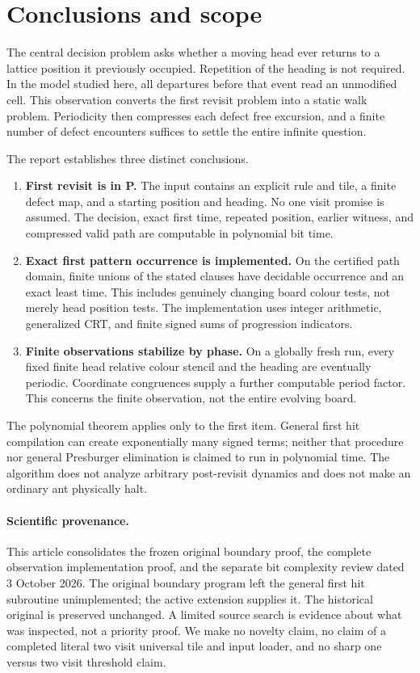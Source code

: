 \documentclass[11pt,letterpaper]{article}
\theoremstyle{definition}\newtheorem{definition}[theorem]{Definition}
\theoremstyle{remark}\newtheorem{remark}[theorem]{Remark}
\begin{document}
\section{Conclusions and scope}\label{ptr:sec:scope}
The central decision problem asks whether a moving head ever returns to a lattice position it previously occupied. Repetition of the heading is not required. In the model studied here, all departures before that event read an unmodified cell. This observation converts the first revisit problem into a static walk problem. Periodicity then compresses each defect free excursion, and a finite number of defect encounters suffices to settle the entire infinite question.

The report establishes three distinct conclusions.
\begin{enumerate}
\item \textbf{First revisit is in P.} The input contains an explicit rule and tile, a finite defect map, and a starting position and heading. No one visit promise is assumed. The decision, exact first time, repeated position, earlier witness, and compressed valid path are computable in polynomial bit time.
\item \textbf{Exact first pattern occurrence is implemented.} On the certified path domain, finite unions of the stated clauses have decidable occurrence and an exact least time. This includes genuinely changing board colour tests, not merely head position tests. The implementation uses integer arithmetic, generalized CRT, and finite signed sums of progression indicators.
\item \textbf{Finite observations stabilize by phase.} On a globally fresh run, every fixed finite head relative colour stencil and the heading are eventually periodic. Coordinate congruences supply a further computable period factor. This concerns the finite observation, not the entire evolving board.
\end{enumerate}

The polynomial theorem applies only to the first item. General first hit compilation can create exponentially many signed terms; neither that procedure nor general Presburger elimination is claimed to run in polynomial time. The algorithm does not analyze arbitrary post-revisit dynamics and does not make an ordinary ant physically halt.

\paragraph{Scientific provenance.}
This article consolidates the frozen original boundary proof, the complete observation implementation proof, and the separate bit complexity review dated 3 October 2026. The original boundary program left the general first hit subroutine unimplemented; the active extension supplies it. The historical original is preserved unchanged. A limited source search is evidence about what was inspected, not a priority proof. We make no novelty claim, no claim of a completed literal two visit universal tile and input loader, and no sharp one versus two visit threshold claim.
\end{document}
